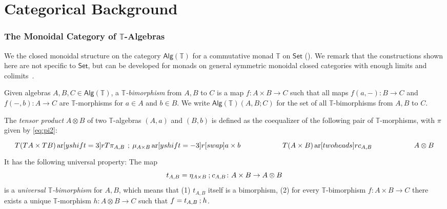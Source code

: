 \documentclass[a4paper, UKenglish, numberwithinsect, thm-restate, cleveref, final]{lipics-v2021}
\theoremstyle{plain}
\theoremstyle{definition}
\newcommand{\T}{\ensuremath{\mathbb{T}}\xspace}
\newcommand{\seq}{\ensuremath{\mathbin{\text{\upshape;}}}}
\newcommand{\Alg}{\ensuremath{\mathsf{Alg}}}
\newcommand{\Set}{\ensuremath{\mathsf{Set}}\xspace}
\DeclareMathOperator{\ar}{ar}
\numberwithin{equation}{section}
\begin{document}
\section{Categorical Background}\label{app:cats}

\subsubsection*{The Monoidal Category of $\T$-Algebras}
We the closed monoidal structure on the category $\Alg(\T)$ for a commutative monad $\T$ on $\Set$ (). We remark that the constructions shown here are not specific to $\Set$, but can be developed for monads on general symmetric monoidal closed categories with enough limits and colimits~\cite{kock-71a,kock-72,seal-2012}.

Given algebras $A,B,C\in \Alg(\T)$, a \emph{$\T$-bimorphism} from $A,B$ to $C$ is a map $f\colon A\times B\to C$ such that all maps $f(a,-)\colon B\to C$ and $f(-, b) \colon A \rightarrow C$ are $\T$-morphisms for $a\in A$ and $b \in B$. We write  $\Alg(\T)(A,B;C)$ for the set of all $\T$-bimorphisms from $A,B$ to $C$.

The \emph{tensor product} $A\otimes B$ of two $\T$-algebras $(A, a)$ and $(B, b)$ is defined as the coequalizer of the following pair of $\T$-morphisms, with $\pi$ given by \eqref{eq:pi2}:
\[
  \begin{tikzcd}[column sep = 50]
    T(TA \times TB)
    \ar[yshift=3]{r}{T \pi_{A,B}\,\seq\, \mu_{A\times B}}
    \ar[yshift=-3]{r}[swap]{a \times b}
    &
    T(A \times B) \ar[two heads]{r}{c_{A,B}} & A\otimes B
  \end{tikzcd}
\]
It has the following universal property: The map
\[t_{A,B} = \eta_{A\times B}\seq c_{A,B}\colon A\times B\to A\otimes B\]
is a \emph{universal $\T$-bimorphism} for \(A, B\), which means that (1) \(t_{A, B}\) itself is a bimorphism, (2) for every $\T$-bimorphism $f\colon A\times B\to C$ there exists a unique $\T$-morphism $h\colon A\otimes B\to C$ such that $f=t_{A,B}\seq h$.
\end{document}
